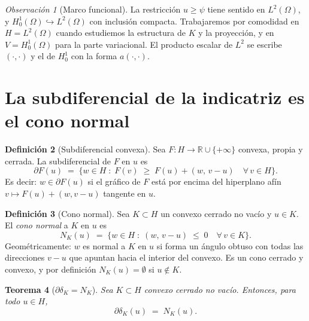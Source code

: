\documentclass[11pt,a4paper]{article}
\newtheorem{teorema}{Teorema}[section]
\theoremstyle{definition}
\newtheorem{definicion}[teorema]{Definición}
\theoremstyle{remark}
\newtheorem{observacion}[teorema]{Observación}
\newcommand{\R}{\mathbb{R}}
\newcommand{\dk}{\delta_K}
\begin{document}
\begin{observacion}[Marco funcional]
La restricción $u \ge \psi$ tiene sentido en $L^2(\Omega)$, y
$H^1_0(\Omega) \hookrightarrow L^2(\Omega)$ con inclusión compacta.
Trabajaremos por comodidad en $H = L^2(\Omega)$ cuando estudiemos la
estructura de $K$ y la proyección, y en $V = H^1_0(\Omega)$ para la parte
variacional. El producto escalar de $L^2$ se escribe $(\cdot,\cdot)$ y el de
$H^1_0$ con la forma $a(\cdot,\cdot)$.
\end{observacion}

\section{La subdiferencial de la indicatriz es el cono normal}

\begin{definicion}[Subdiferencial convexa]
Sea $F : H \to \R \cup \{+\infty\}$ convexa, propia y cerrada.
La subdiferencial de $F$ en $u$ es
\[
\partial F(u) \;=\; \bigl\{ w \in H \;:\;
F(v) \;\ge\; F(u) + (w,\, v-u) \quad \forall\, v \in H \bigr\}.
\]
Es decir: $w \in \partial F(u)$ si el gráfico de $F$ está por encima del
hiperplano afín $v \mapsto F(u) + (w, v-u)$ tangente en $u$.
\end{definicion}

\begin{definicion}[Cono normal]
Sea $K \subset H$ un convexo cerrado no vacío y $u \in K$. El \emph{cono
normal} a $K$ en $u$ es
\[
N_K(u) \;=\; \bigl\{ w \in H \;:\; (w,\, v - u) \;\le\; 0 \quad \forall\, v \in K \bigr\}.
\]
Geométricamente: $w$ es normal a $K$ en $u$ si forma un ángulo obtuso con
todas las direcciones $v - u$ que apuntan hacia el interior del convexo.
Es un cono cerrado y convexo, y por definición $N_K(u) = \emptyset$ si $u \notin K$.
\end{definicion}

\begin{teorema}[$\partial \dk = N_K$]\label{thm:ind-normal}
Sea $K \subset H$ convexo cerrado no vacío. Entonces, para todo $u \in H$,
\[
\partial \dk(u) \;=\; N_K(u).
\]
\end{teorema}
\end{document}
